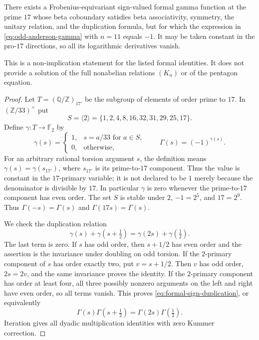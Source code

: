 \begin{proposition}\label{prop:formal-odd-sign}
There exists a Frobenius-equivariant sign-valued formal gamma function
at the prime $17$ whose beta coboundary satisfies beta associativity,
symmetry, the unitary relation, and the duplication formula, but for
which the expression in \eqref{eq:odd-anderson-gamma} with $n=11$
equals $-1$.  It may be taken constant in the pro-$17$ directions,
so all its logarithmic derivatives vanish.

This is a non-implication statement for the listed formal identities.
It does not provide a solution of the full nonabelian relations
$(K_n)$ or of the pentagon equation.
\end{proposition}

\begin{proof}
Let $T=(\mathbb Q/\mathbb Z)_{17'}$ be the subgroup of elements of
order prime to $17$.  In $(\mathbb Z/33)^\times$ put
\[
 S=\langle2\rangle
   =\{1,2,4,8,16,32,31,29,25,17\}.
\]
Define $\gamma:T\to\mathbb F_2$ by
\[
 \gamma(s)=
 \begin{cases}
  1,&s=a/33\text{ for }a\in S,\\
  0,&\text{otherwise},
 \end{cases}
 \qquad \Gamma(s)=(-1)^{\gamma(s)}.
\]
For an arbitrary rational torsion argument $s$, the definition means
$\gamma(s)=\gamma(s_{17'})$, where $s_{17'}$ is its prime-to-$17$
component.  Thus the value is constant in the $17$-primary variable;
it is not declared to be $1$ merely because the denominator is
divisible by $17$.  In particular $\gamma$ is zero whenever the
prime-to-$17$ component has even order.
The set $S$ is stable under $2$, $-1=2^5$, and $17=2^9$.
Thus $\Gamma(-s)=\Gamma(s)$ and $\Gamma(17s)=\Gamma(s)$.

We check the duplication relation
\begin{equation}
 \gamma(s)+\gamma(s+\tfrac12)=\gamma(2s)+\gamma(\tfrac12).
 \label{eq:formal-sign-duplication}
\end{equation}
The last term is zero.  If $s$ has odd order, then $s+1/2$ has
even order and the assertion is the invariance under doubling on
odd torsion.  If the $2$-primary component of $s$ has order exactly
two, put $v=s+1/2$.  Then $v$ has odd order, $2s=2v$, and the same
invariance proves the identity.  If the $2$-primary component has
order at least four, all three possibly nonzero arguments on the
left and right have even order, so all terms vanish.  This proves
\eqref{eq:formal-sign-duplication}, or equivalently
\[
 \Gamma(s)\Gamma(s+\tfrac12)=\Gamma(2s)\Gamma(\tfrac12).
\]
Iteration gives all dyadic multiplication identities with zero Kummer
correction.


\end{proof}
